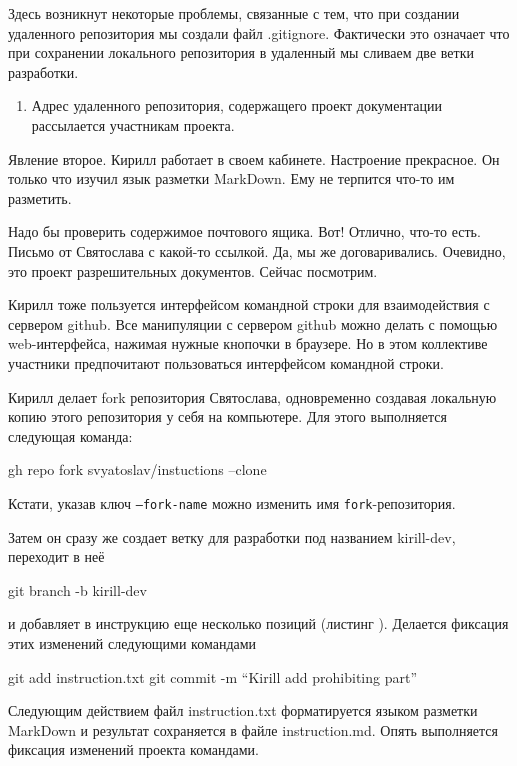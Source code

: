 \documentclass[14pt,a4paper]{article}
\begin{document}
{
{\normalfont Здесь возникнут некоторые проблемы, связанные с тем, что при создании 
удаленного репозитория мы создали файл .gitignore. Фактически это означает что 
при сохранении локального репозитория в удаленный мы сливаем две ветки разработки.}

  \begin{enumerate}[resume]
\item Адрес удаленного репозитория, содержащего проект документации рассылается участникам
проекта. 
\end{enumerate}
}

Явление второе.
Кирилл работает в своем кабинете. Настроение прекрасное. Он только что изучил язык разметки
MarkDown. Ему не терпится что-то им разметить. 

 Надо бы проверить содержимое почтового ящика. Вот! Отлично, что-то есть. 
Письмо от Святослава с какой-то ссылкой. Да, мы же договаривались. Очевидно, это проект
разрешительных документов. Сейчас посмотрим.

 Кирилл тоже пользуется интерфейсом командной строки для взаимодействия с сервером
github. Все манипуляции с сервером github можно делать с помощью web-интерфейса, нажимая
нужные кнопочки в браузере. Но в этом коллективе участники предпочитают пользоваться интерфейсом
командной строки. 

Кирилл делает fork репозитория Святослава, одновременно
создавая локальную копию этого репозитория у себя на компьютере. Для этого выполняется следующая
команда:

gh repo fork svyatoslav/instuctions --clone

Кстати, указав ключ \texttt{--fork-name} можно изменить имя \texttt{fork}-репозитория.

Затем он сразу же создает ветку для разработки под названием kirill-dev, переходит в  неё 

git branch -b kirill-dev

и добавляет в инструкцию еще несколько позиций (листинг ).
Делается фиксация этих изменений следующими командами

git add instruction.txt
git commit -m ``Kirill add prohibiting part''

Следующим действием файл instruction.txt форматируется языком разметки MarkDown и результат 
сохраняется в файле instruction.md.
Опять выполняется фиксация изменений проекта командами. 
\end{document}
